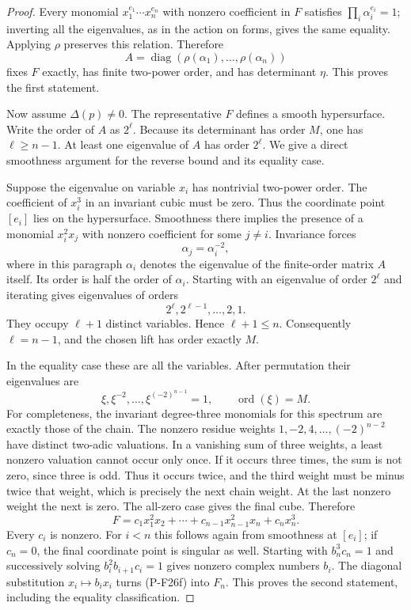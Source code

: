 \documentclass[11pt,a4paper]{article}
\begin{document}
\begin{proof}
Every monomial $x_1^{e_1}\cdots x_n^{e_n}$ with nonzero
coefficient in $F$ satisfies $\prod_i\alpha_i^{e_i}=1$;
inverting all the eigenvalues, as in the action on forms,
gives the same equality. Applying $\rho$ preserves this
relation. Therefore
\[
 A=\operatorname{diag}(\rho(\alpha_1),\ldots,
                       \rho(\alpha_n))
 \tag{P-F26c}
\]
fixes $F$ exactly, has finite two-power order, and has
determinant $\eta$. This proves the first statement.

Now assume $\Delta(p)\ne0$. The representative $F$ defines
a smooth hypersurface. Write the order of $A$ as $2^\ell$.
Because its determinant has order $M$, one has $\ell\ge n-1$.
At least one eigenvalue of $A$ has order $2^\ell$.
We give a direct smoothness argument for the reverse bound
and its equality case.

Suppose the eigenvalue on variable $x_i$ has nontrivial
two-power order. The coefficient of $x_i^3$ in an invariant
cubic must be zero. Thus the coordinate point $[e_i]$ lies
on the hypersurface. Smoothness there implies the presence
of a monomial $x_i^2x_j$ with nonzero coefficient for some
$j\ne i$. Invariance forces
\[
 \alpha_j=\alpha_i^{-2},
 \tag{P-F26d}
\]
where in this paragraph $\alpha_i$ denotes the eigenvalue
of the finite-order matrix $A$ itself. Its order is half
the order of $\alpha_i$. Starting with an eigenvalue of
order $2^\ell$ and iterating gives eigenvalues of orders
\[
 2^\ell,2^{\ell-1},\ldots,2,1.
\]
They occupy $\ell+1$ distinct variables. Hence $\ell+1\le n$.
Consequently $\ell=n-1$, and the chosen lift has order
exactly $M$.

In the equality case these are all the variables. After
permutation their eigenvalues are
\[
 \xi,\xi^{-2},\ldots,\xi^{(-2)^{n-1}}=1,
 \qquad \operatorname{ord}(\xi)=M.
 \tag{P-F26e}
\]
For completeness, the invariant degree-three monomials for
this spectrum are exactly those of the chain. The nonzero
residue weights $1,-2,4,\ldots,(-2)^{n-2}$ have distinct
two-adic valuations. In a vanishing sum of three weights,
a least nonzero valuation cannot occur only once. If it
occurs three times, the sum is not zero, since three is odd.
Thus it occurs twice, and the third weight must be minus
twice that weight, which is precisely the next chain weight.
At the last nonzero weight the next is zero. The all-zero
case gives the final cube. Therefore
\[
 F=c_1x_1^2x_2+\cdots+c_{n-1}x_{n-1}^2x_n+c_nx_n^3.
 \tag{P-F26f}
\]
Every $c_i$ is nonzero. For $i<n$ this follows again from
smoothness at $[e_i]$; if $c_n=0$, the final coordinate
point is singular as well. Starting with $b_n^3c_n=1$
and successively solving $b_i^2b_{i+1}c_i=1$ gives nonzero
complex numbers $b_i$. The diagonal substitution
$x_i\mapsto b_ix_i$ turns (P-F26f) into $F_n$. This proves
the second statement, including the equality classification.


\end{proof}
\end{document}
